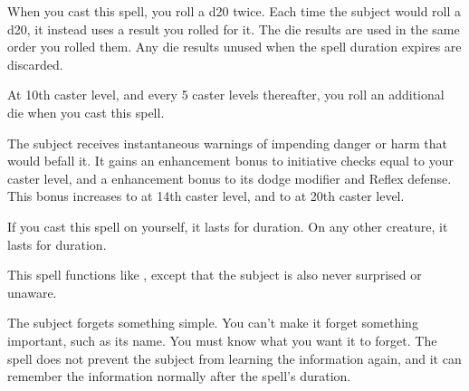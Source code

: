 \spelldur{\durshort}
\begin{spelleffect}
    When you cast this spell, you roll a d20 twice. Each time the subject would roll a d20, it instead uses a result you rolled for it. The die results are used in the same order you rolled them. Any die results unused when the spell duration expires are discarded.

    At 10th caster level, and every 5 caster levels thereafter, you roll an additional die when you cast this spell.
\end{spelleffect}

\begin{spelleffect} 
    The subject receives instantaneous warnings of impending danger or harm that would befall it. It gains an enhancement bonus to initiative checks equal to your caster level, and a  enhancement bonus to its dodge modifier and Reflex defense. This bonus increases to  at 14th caster level, and to  at 20th caster level.
    \par If you cast this spell on yourself, it lasts for \durlong duration. On any other creature, it lasts for \durshort duration.
\end{spelleffect}

\begin{spelleffect}
    This spell functions like , except that the subject is also never surprised or unaware.
\end{spelleffect}

\spelldur{\durlong}
\begin{spelleffect}
    The subject forgets something simple. You can't make it forget something important, such as its name. You must know what you want it to forget. The spell does not prevent the subject from learning the information again, and it can remember the information normally after the spell's duration.
\end{spelleffect}

